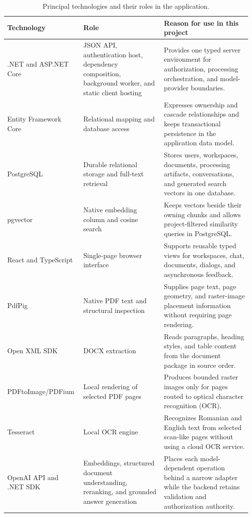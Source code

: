 \begin{table}[!htbp]
    \centering
    \caption{Principal technologies and their roles in the application.}
    \label{tab:technology-stack}
    \small
    \begin{tabular}{L{0.23\textwidth} L{0.31\textwidth} L{0.36\textwidth}}
        \toprule
        \textbf{Technology} & \textbf{Role} & \textbf{Reason for use in this project} \\
        \midrule
        .NET and ASP.NET Core & JSON API, authentication host, dependency composition, background worker, and static client hosting & Provides one typed server environment for authorization, processing orchestration, and model-provider boundaries. \\
        Entity Framework Core & Relational mapping and database access & Expresses ownership and cascade relationships and keeps transactional persistence in the application data model. \\
        PostgreSQL & Durable relational storage and full-text retrieval & Stores users, workspaces, documents, processing artifacts, conversations, and generated search vectors in one database. \\
        pgvector & Native embedding column and cosine search & Keeps vectors beside their owning chunks and allows project-filtered similarity queries in PostgreSQL. \\
        React and TypeScript & Single-page browser interface & Supports reusable typed views for workspaces, chat, documents, dialogs, and asynchronous feedback. \\
        PdfPig & Native PDF text and structural inspection & Supplies page text, page geometry, and raster-image placement information without requiring page rendering. \\
        Open XML SDK & DOCX extraction & Reads paragraphs, heading styles, and table content from the document package in source order. \\
        PDFtoImage/PDFium & Local rendering of selected PDF pages & Produces bounded raster images only for pages routed to optical character recognition (OCR). \\
        Tesseract & Local OCR engine & Recognizes Romanian and English text from selected scan-like pages without using a cloud OCR service. \\
        OpenAI API and .NET SDK & Embeddings, structured document understanding, reranking, and grounded answer generation & Places each model-dependent operation behind a narrow adapter while the backend retains validation and authorization authority. \\
        \bottomrule
    \end{tabular}
\end{table}

